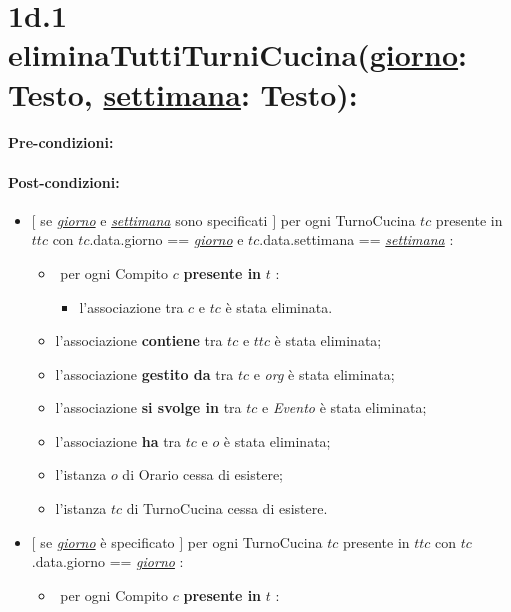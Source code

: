 \section*{1d.1 eliminaTuttiTurniCucina(\underline{giorno}: Testo, \underline{settimana}: Testo):}

\paragraph{Pre-condizioni:}

\paragraph{Post-condizioni:} 
\begin{itemize}
   \item $[$ se \underline{\textit{giorno}} e \underline{\textit{settimana}} sono specificati $]$ \textlangle per ogni TurnoCucina $tc$ presente in $ttc$ con $tc$.data.giorno == \underline{\textit{giorno}} e $tc$.data.settimana == \underline{\textit{settimana}} \textrangle:
\begin{itemize}
   \item \textlangle $ $ per ogni Compito $c$ \textbf{presente in} $t$ \textrangle:
    \begin{itemize}
        \item l'associazione tra $c$ e $tc$ è stata eliminata.
        \end{itemize}
    \item l'associazione \textbf{contiene} tra $tc$ e $ttc$ è stata eliminata;
    \item l'associazione \textbf{gestito da} tra $tc$ e \textit{org} è stata eliminata;
\item l'associazione \textbf{si svolge in} tra $tc$ e \textit{Evento} è stata eliminata;
  \item l'associazione \textbf{ha} tra $tc$ e $o$ è stata eliminata;
    \item l'istanza $o$ di Orario cessa di esistere;
    \item l'istanza $tc$ di TurnoCucina cessa di esistere.
\end{itemize}
   \item $[$ se \underline{\textit{giorno}} è specificato $]$ \textlangle per ogni TurnoCucina $tc$ presente in $ttc$ con $tc$.data.giorno == \underline{\textit{giorno}} \textrangle:
\begin{itemize}
   \item \textlangle $ $ per ogni Compito $c$ \textbf{presente in} $t$ \textrangle:

\end{itemize}
\end{itemize}
